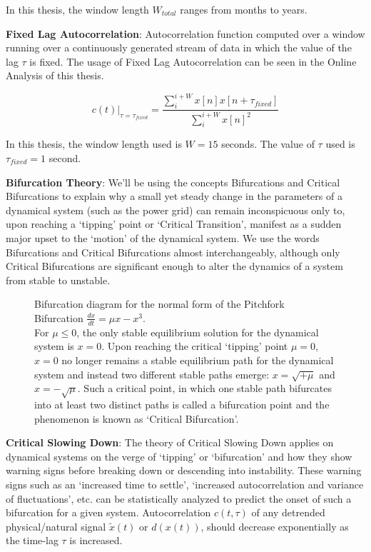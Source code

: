  In this thesis, the window length $W_{total}$ ranges from months to years.
 
 \textbf{Fixed Lag Autocorrelation}: Autocorrelation function computed over a window running over a continuously generated stream of data in which the value of the lag $\tau$ is fixed. The usage of Fixed Lag Autocorrelation can be seen in the Online Analysis of this thesis.
 
 \begin{equation}
 	c(t)|_{\tau = \tau_{fixed}} = \frac{\sum_{i}^{i+W} x[n]x[n+\tau_{fixed}]}{\sum_{i}^{i+W} x[n]^2} 
 \end{equation}
 
 In this thesis, the window length used is $W=15$ seconds. The value of $\tau$ used is $\tau_{fixed}=1$ second.

\textbf{Bifurcation Theory}: We'll be using the concepts Bifurcations and Critical Bifurcations to explain why a small yet steady change in the parameters of a dynamical system (such as the power grid) can remain inconspicuous only to, upon reaching a `tipping' point or `Critical Transition', manifest as a sudden major upset to the `motion' of the dynamical system. We use the words Bifurcations and Critical Bifurcations almost interchangeably, although only Critical Bifurcations are significant enough to alter the dynamics of a system from stable to unstable.


\begin{figure}[ht]
	\caption{Bifurcation diagram for the normal form of the Pitchfork Bifurcation $\frac{dx}{dt} = \mu x - x^3$. \\ For $\mu \leq 0$, the only stable equilibrium solution for the dynamical system is $x=0$. Upon reaching the critical `tipping' point $\mu=0$, $x=0$ no longer remains a stable equilibrium path for the dynamical system and instead two different stable paths emerge: $x = \sqrt{+\mu}$ and $x = -\sqrt{\mu}$. Such a critical point, in which one stable path bifurcates into at least two distinct paths is called a bifurcation point and the phenomenon is known as `Critical Bifurcation'.}
\end{figure}


\textbf{Critical Slowing Down}: The theory of Critical Slowing Down applies on dynamical systems on the verge of `tipping' or `bifurcation' and how they show warning signs before breaking down or descending into instability. These warning signs such as an `increased time to settle', `increased autocorrelation and variance of fluctuations', etc. \cite{schefferEarlyWarningSignalsForCriticalTransitions} can be statistically analyzed to predict the onset of such a bifurcation for a given system.
Autocorrelation $c(t, \tau)$ of any detrended physical/natural signal $\tilde{x}(t)$ or $d(x(t))$, should decrease exponentially as the time-lag $\tau$ is increased.

